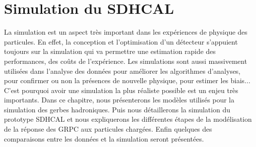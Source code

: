 \chapter{Simulation du SDHCAL}
\label{chap.simulation}
La simulation est un aspect très important dans les expériences de physique des particules. En effet, la conception et l'optimisation d'un détecteur s'appuient toujours sur la simulation qui va permettre une estimation rapide des performances, des coûts de l'expérience. Les simulations sont aussi massivement utilisées dans l'analyse des données pour améliorer les algorithmes d'analyses, pour confirmer ou non la présences de nouvelle physique, pour estimer les biais... C'est pourquoi avoir une simulation la plus réaliste possible est un enjeu très importants. Dans ce chapitre, nous présenterons les modèles utilisés pour la simulation des gerbes hadroniques. Puis nous détaillerons la simulation du prototype SDHCAL et nous expliquerons les différentes étapes de la modélisation de la réponse des GRPC aux particules chargées. Enfin quelques des comparaisons entre les données et la simulation seront présentées. 
\minitoc
\newpage


